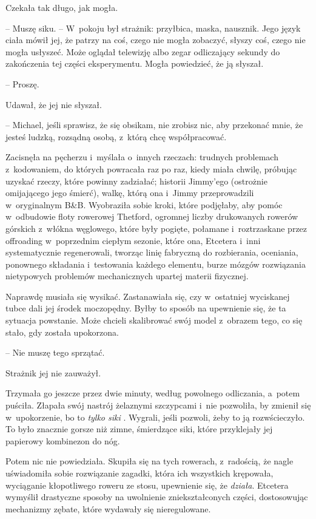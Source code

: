 \documentclass[oneside,polish,11pt,sfheadings]{mwbk}
\begin{document}
Czekała tak długo, jak mogła. 

-- Muszę siku. -- W~pokoju był strażnik:
przyłbica, maska, nausznik. Jego język ciała mówił jej, że patrzy na
coś, czego nie mogła zobaczyć, słyszy coś, czego nie mogła usłyszeć.
Może oglądał telewizję albo zegar odliczający sekundy do zakończenia tej
części eksperymentu. Mogła powiedzieć, że ją słyszał.

-- Proszę.

Udawał, że jej nie słyszał. 

-- Michael, jeśli sprawisz, że się obsikam,
nie zrobisz nic, aby przekonać mnie, że jesteś ludzką, rozsądną osobą, z~którą chcę współpracować.

Zacisnęła na pęcherzu i~myślała o~innych rzeczach: trudnych problemach z~kodowaniem, do których powracała raz po raz, kiedy miała chwilę,
próbując uzyskać rzeczy, które powinny zadziałać; historii Jimmy'ego
(ostrożnie omijającego jego śmierć), walkę, którą ona i~Jimmy
przeprowadzili w~oryginalnym B\&B. Wyobraziła sobie kroki, które
podjęłaby, aby pomóc w~odbudowie floty rowerowej Thetford, ogromnej
liczby drukowanych rowerów górskich z~włókna węglowego, które były
pogięte, połamane i~roztrzaskane przez offroading w~poprzednim ciepłym
sezonie, które ona, Etcetera i~inni systematycznie regenerowali, tworząc
linię fabryczną do rozbierania, oceniania, ponownego składania i~testowania każdego elementu, burze mózgów rozwiązania nietypowych
problemów mechanicznych upartej materii fizycznej.

Naprawdę musiała się wysikać. Zastanawiała się, czy w~ostatniej
wyciskanej tubce dali jej środek moczopędny. Byłby to sposób na
upewnienie się, że ta sytuacja powstanie. Może chcieli skalibrować swój
model z~obrazem tego, co się stało, gdy została upokorzona.

-- Nie muszę tego sprzątać.

Strażnik jej nie zauważył.

Trzymała go jeszcze przez dwie minuty, według powolnego odliczania, a~potem puściła. Złapała swój nastrój żelaznymi szczypcami i~nie
pozwoliła, by zmienił się w~upokorzenie, bo to \textit{tylko siki }.
Wygrali, jeśli pozwoli, żeby to ją rozwścieczyło. To było znacznie
gorsze niż zimne, śmierdzące siki, które przyklejały jej papierowy
kombinezon do nóg.

Potem nic nie powiedziała. Skupiła się na tych rowerach, z~radością, że
nagle uświadomiła sobie rozwiązanie zagadki, która ich wszystkich
krępowała, wyciąganie kłopotliwego roweru ze stosu, upewnienie się, że
\textit{działa}. Etcetera wymyślił drastyczne sposoby na uwolnienie
zniekształconych części, dostosowując mechanizmy zębate, które wydawały
się nieregulowane.
\end{document}
